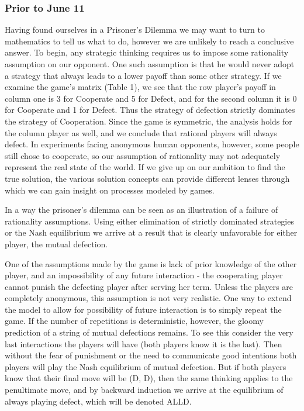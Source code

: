 \subsubsection{Prior to June 11}
Having found ourselves in a Prisoner's Dilemma we may want to turn to mathematics to tell us what to do, however we are unlikely to reach a conclusive answer. To begin, any strategic thinking requires us to impose some rationality assumption on our opponent. One such assumption is that he would never adopt a strategy that always leads to a lower payoff than some other strategy. If we examine the game's matrix (Table 1), we see that the row player's payoff in column one is 3 for Cooperate and 5 for Defect, and for the second column it is 0 for Cooperate and 1 for Defect. Thus the strategy of defection strictly dominates the strategy of Cooperation. Since the game is symmetric, the analysis holds for the column player as well, and we conclude that rational players will always defect. In experiments facing anonymous human opponents, however, some people still chose to cooperate, so our assumption of rationality may not adequately represent the real state of the world. If we give up on our ambition to find the true solution, the various solution concepts can provide different lenses through which we can gain insight on processes modeled by games.

In a way the prisoner's dilemma can be seen as an illustration of a failure of rationality assumptions. Using either elimination of strictly dominated strategies or the Nash equilibrium we arrive at a result that is clearly unfavorable for either player, the mutual defection.

One of the assumptions made by the game is lack of prior knowledge of the other player, and an impossibility of any future interaction - the cooperating player cannot punish the defecting player after serving her term. Unless the players are completely anonymous, this assumption is not very realistic. One way to extend the model to allow for possibility of future interaction is to simply repeat the game. If the number of repetitions is deterministic, however, the gloomy prediction of a string of mutual defections remains. To see this consider the very last interactions the players will have (both players know it is the last). Then without the fear of punishment or the need to communicate good intentions both players will play the Nash equilibrium of mutual defection. But if both players know that their final move will be (D, D), then the same thinking applies to the penultimate move, and by backward induction we arrive at the equilibrium of always playing defect, which will be denoted ALLD.

